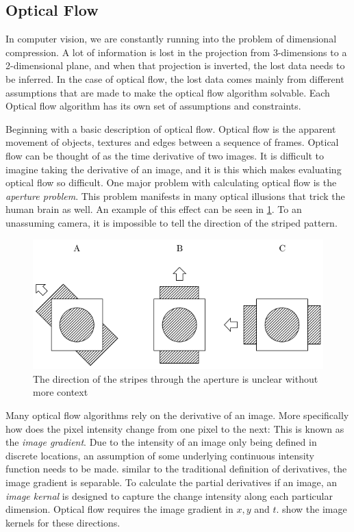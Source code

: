 \documentclass{UoNMCHA}
\numberwithin{equation}{section}
\begin{document}
\newpage
\subsection{Optical Flow}
In computer vision, we are constantly running into the problem of dimensional compression. A lot of information is lost in the projection from 3-dimensions to a 2-dimensional plane, and when that projection is inverted, the lost data needs to be inferred. In the case of optical flow, the lost data comes mainly from different assumptions that are made to make the optical flow algorithm solvable. Each Optical flow algorithm has its own set of assumptions and constraints.

Beginning with a basic description of optical flow. Optical flow is the apparent movement of objects, textures and edges between a sequence of frames. Optical flow can be thought of as the time derivative of two images. It is difficult to imagine taking the derivative of an image, and it is this which makes evaluating optical flow so difficult. One major problem with calculating optical flow is the \textit{aperture problem}. This problem manifests in many optical illusions that trick the human brain as well. An example of this effect can be seen in \cref{fig:ApertureProblem}. To an unassuming camera, it is impossible to tell the direction of the striped pattern.

\begin{figure}[ht]
    \begin{center}
        \includegraphics[width=.6\linewidth]{Figures/ApertureProblem}
        \caption{The direction of the stripes through the aperture is unclear without more context}
        \label{fig:ApertureProblem}
    \end{center}
\end{figure}

Many optical flow algorithms rely on the derivative of an image. More specifically how does the pixel intensity change from one pixel to the next: This is known as the \textit{image gradient}. Due to the intensity of an image only being defined in discrete locations, an assumption of some underlying continuous intensity function needs to be made. similar to the traditional definition of derivatives, the image gradient is separable. To calculate the partial derivatives if an image, an \textit{image kernal} is designed to capture the change intensity along each particular dimension. Optical flow requires the image gradient in $x, y$ and $t$.  show the image kernels for these directions.
\end{document}
